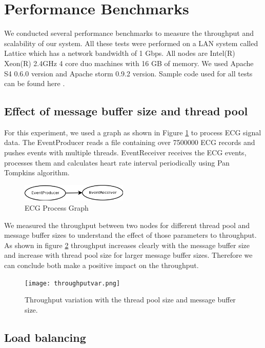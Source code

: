 \section{Performance Benchmarks}

We conducted several performance benchmarks to measure the throughput and scalability of our system. All these tests were performed on a LAN system called Lattice which has a network bandwidth of 1 Gbps. All nodes are Intel(R) Xeon(R) 2.4GHz 4 core duo machines with 16 GB of memory. We used Apache S4 0.6.0 version and Apache storm 0.9.2 version. Sample code used for all tests can be found here \cite{solutionCode}.


\subsection{Effect of message buffer size and thread pool}
For this experiment, we used a graph as shown in Figure \ref{ecgGraph} to process ECG signal data. The EventProducer reads a file containing over 7500000
 ECG records and pushes events with multiple threads. EventReceiver receives the ECG events, processes them and calculates heart rate interval periodically using Pan Tompkins algorithm. 

\begin{figure}[!t]
        \centering
        \includegraphics[width=2.0in]{ecgGraph.png}
        \caption{ECG Process Graph}
        \label{ecgGraph}
\end{figure}


We measured the throughput between two nodes for different thread pool and message buffer sizes to understand the effect of those parameters to throughput. As shown in figure \ref{throughputvar} throughput increases clearly with the message buffer size and increase with thread pool size for larger message buffer sizes. Therefore we can conclude both make a positive impact on the throughput.

\begin{figure}[!t]
        \centering
        \texttt{[image: throughputvar.png]}
        \caption{Throughput variation with the thread pool size and message buffer size.}
        \label{throughputvar}
\end{figure}

\subsection{Load balancing}

